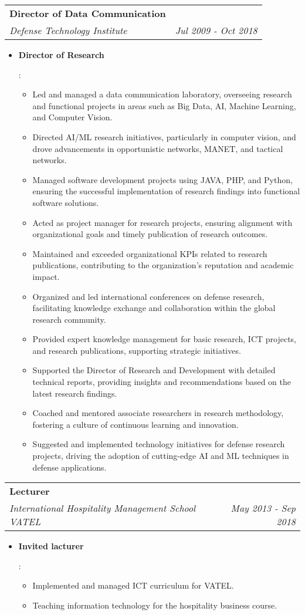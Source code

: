 \documentclass[letterpaper,11pt]{article}
\makeatletter
\newcommand{\resumeItem}[2]{
  \item\small{
    \textbf{#1}{: #2 \vspace{-2pt}}
  }
}
\newcommand{\resumeSubheading}[4]{
  \vspace{-1pt}\item
    \begin{tabular*}{0.97\textwidth}[t]{l@{\extracolsep{\fill}}r}
      \textbf{#1} & #2 \\
      \textit{\small#3} & \textit{\small #4} \\
    \end{tabular*}\vspace{-5pt}
}
\newcommand{\resumeItemListStart}{\begin{itemize}}
\newcommand{\resumeItemListEnd}{\end{itemize}\vspace{-5pt}}
\makeatother
\begin{document}
    \resumeSubheading
      {Director of Data Communication}{}
      {Defense Technology Institute}{Jul 2009 - Oct 2018}
      \resumeItemListStart
      \resumeItem{Director of Research}{
      \begin{itemize}
        \item Led and managed a data communication laboratory, overseeing research and functional projects in areas such as Big Data, AI, Machine Learning, and Computer Vision.
        \item Directed AI/ML research initiatives, particularly in computer vision, and drove advancements in opportunistic networks, MANET, and tactical networks.
        \item Managed software development projects using JAVA, PHP, and Python, ensuring the successful implementation of research findings into functional software solutions.
        \item Acted as project manager for research projects, ensuring alignment with organizational goals and timely publication of research outcomes.
        \item Maintained and exceeded organizational KPIs related to research publications, contributing to the organization's reputation and academic impact.
        \item Organized and led international conferences on defense research, facilitating knowledge exchange and collaboration within the global research community.
        \item Provided expert knowledge management for basic research, ICT projects, and research publications, supporting strategic initiatives.
        \item Supported the Director of Research and Development with detailed technical reports, providing insights and recommendations based on the latest research findings.
        \item Coached and mentored associate researchers in research methodology, fostering a culture of continuous learning and innovation.
        \item Suggested and implemented technology initiatives for defense research projects, driving the adoption of cutting-edge AI and ML techniques in defense applications.
      \end{itemize}
      }
  \resumeItemListEnd

    \resumeSubheading
      {Lecturer}{}
      {International Hospitality Management School VATEL}{May 2013 - Sep 2018}
      \resumeItemListStart
        \resumeItem{Invited lacturer}
          {\begin{itemize}
              \item Implemented and managed ICT curriculum for VATEL.
              \item Teaching information technology for the hospitality business course.
            \end{itemize}}
      \resumeItemListEnd
\end{document}
